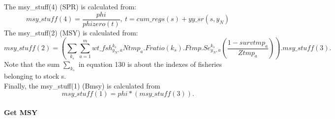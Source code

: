 \documentclass{article}
\begin{document}
The msy\_stuff(4) (SPR) is calculated from:
\begin{equation}
    msy\_stuff(4)=\dfrac{phi}{phizero(t)}, \ t=cum\_regs(s)+yy\_sr(s,y_N)
\end{equation}
The msy\_stuff(2) (MSY) is calculated from:
\begin{equation}
    msy\_stuff(2)=\left(\sum_{k_s}\sum_{a=1}^m wt\_fsh^{k_s}_{y_N,a}Ntmp_a.Fratio(k_s).Ftmp.Se^{k_s}_{y_N,a}\left(\dfrac{1-survtmp_a}{Ztmp_a}\right)\right).msy\_stuff(3).
\end{equation}
Note that the sum $\displaystyle\sum_{k_s}$ in equation 130 is about the indexes of fisheries belonging to stock s.\\
Finally, the msy\_stuff(1) (Bmsy) is calculated from
\begin{equation}
    msy\_stuff(1)=phi*(msy\_stuff(3)).
\end{equation}
\\
\textbf{Get MSY}\\
\end{document}
